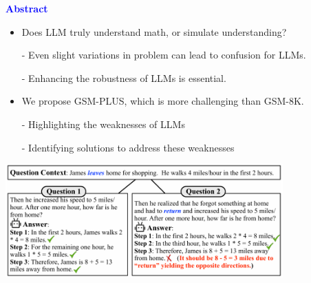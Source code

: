 \documentclass[professionalfont]{beamer}
\begin{document}
\frame{\titlepage}


\begin{frame}
\begin{center}
    { \textbf{\textcolor{blue}{ {\fontsize{12}{14}\selectfont Abstract} }} }
\end{center}

{\fontsize{10}{14}\selectfont 
\begin{itemize}
    \item Does LLM truly understand math, or simulate understanding?
    
    - Even slight variations in problem can lead to confusion for LLMs.
    
    - Enhancing the robustness of LLMs is essential.
\end{itemize}

\begin{itemize}
    \item We propose GSM-PLUS, which is more challenging than GSM-8K.
    
    - Highlighting the weaknesses of LLMs
    
    - Identifying solutions to address these weaknesses
\end{itemize}
}

\begin{center}
    \includegraphics[width=0.8\textwidth]{figure1.png}
\end{center}
\end{frame}
\end{document}

